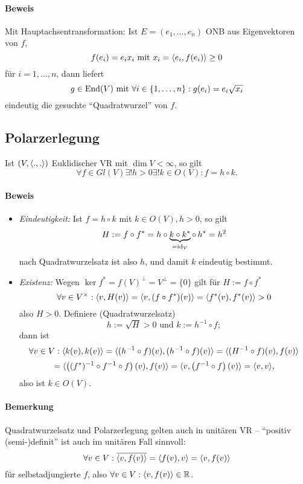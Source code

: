 \paragraph{Beweis}
	Mit Hauptachsentransformation: Ist $ E = (e_1,\dots,e_n) $ ONB aus Eigenvektoren von $ f $,
		\[ f(e_i) = e_ix_i \text{ mit } x_i = \langle e_i,f(e_i) \rangle\geq 0 \]
	für $ i=1,\dots,n $, dann liefert
		\[ g\in\operatorname{End}(V) \text{ mit } \forall i\in \{1,\dots,n\}: g(e_i) = e_i\sqrt{x_i} \]
	eindeutig die gesuchte "`Quadratwurzel"' von $ f $.
\subsection{Polarzerlegung}
	Ist $ (V,\langle .,. \rangle) $ Euklidischer VR mit $ \dim V <\infty $, so gilt
		\[ \forall f\in Gl(V) \exists! h > 0 \exists! k\in O(V) : f = h\circ k. \]
\paragraph{Beweis}
	
	\begin{itemize}
		\item \emph{Eindeutigkeit:\quad} Ist $ f=h\circ k $ mit $ k\in O(V), h>0 $, so gilt
		\[ H:= f\circ f^* = h\circ \underbrace{k \circ k^*}_{=\operatorname{id}_V} \circ\, h^* = h^2 \]
		nach Quadratwurzelsatz ist also $ h $, und damit $ k $ eindeutig bestimmt.
		\item \emph{Existenz:\quad} Wegen $ \ker f^* = f(V)^\perp = V^\perp = \{0\} $ gilt für $ H:= f\circ f^* $
			\[ \forall v\in V^\times: \langle v,H(v) \rangle = \langle v,(f\circ f^*)(v) \rangle = \langle f^*(v),f^*(v) \rangle>0  \]
		also $ H>0 $. Definiere (Quadratwurzelsatz)
			\[ h:= \sqrt{H}>0 \text{ und } k:= h^{-1}\circ f; \]
		dann ist
			\[ \forall v\in V: \langle k(v),k(v) \rangle = \langle (h^{-1}\circ f)(v),(h^{-1}\circ f)(v) \rangle = \langle (H^{-1}\circ f)(v),f(v) \rangle \]
			\[= \langle \left((f^*)^{-1}\circ f^{-1}\circ f\right)(v),f(v) \rangle = \langle v,\left(f^{-1}\circ f\right)(v) \rangle = \langle v,v \rangle, \]
		also ist $ k\in O(V) $.
	\end{itemize}
\paragraph{Bemerkung}
	Quadratwurzelsatz und Polarzerlegung gelten auch in unitären VR -- "`positiv (semi-)definit"' ist auch im unitären Fall sinnvoll:
		\[ \forall v\in V: \overline{\langle v,f(v) \rangle} = \langle f(v),v \rangle=\langle v,f(v) \rangle \]
	für selbstadjungierte $ f $, also $ \forall v\in V: \langle v,f(v) \rangle\in \mathbb{R} $.